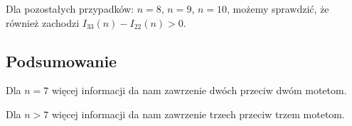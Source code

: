 Dla pozostałych przypadków: $n=8$, $n=9$, $n=10$, możemy sprawdzić, że również zachodzi $I_{33}(n) - I_{22}(n) > 0$.

\subsection*{Podsumowanie}

Dla $n=7$ więcej informacji da nam zawrzenie dwóch przeciw dwóm motetom.

Dla $n>7$ więcej informacji da nam zawrzenie trzech przeciw trzem motetom.




  

